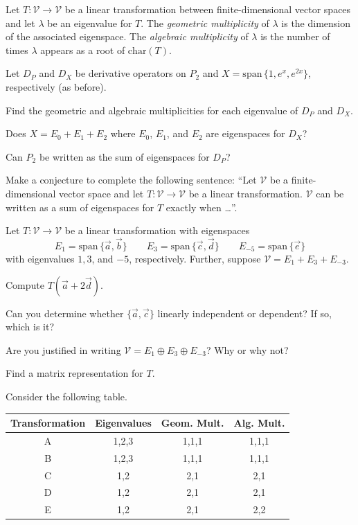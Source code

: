 \documentclass[14pt]{problemset}
\newcommand{\Span}{\mathrm{span}\,}
\newcommand{\Char}{\mathrm{char}}
\begin{document}
	\begin{definition}
		Let $T:\mathcal V\to\mathcal V$ be a linear transformation 
		between finite-dimensional vector spaces and let $\lambda$
		be an eigenvalue for $T$. The \emph{geometric multiplicity} of $\lambda$ is
		the dimension of the associated eigenspace. The \emph{algebraic multiplicity} of
		$\lambda$ is the number of times $\lambda$ appears as a root of $\Char(T)$.
	\end{definition}

	\question
	Let $D_P$ and $D_X$ be derivative operators on $P_2$ and $X=\Span\{1,e^x,e^{2x}\}$, respectively (as before).
	\begin{parts}
		\item Find the geometric and algebraic multiplicities for each eigenvalue of $D_P$ and $D_X$.
		\item Does $X=E_0+E_1+E_2$ where $E_0$, $E_1$, and $E_2$ are eigenspaces for $D_X$?
		\item Can $P_2$ be written as the sum of eigenspaces for $D_P$?
		\item Make a conjecture to complete the following sentence: 
			``Let $\mathcal V$ be a finite-dimensional vector space and let $T:\mathcal V\to\mathcal V$
			be a linear transformation. $\mathcal V$
			can be written as a sum of eigenspaces for $T$ exactly when \ldots''.
	\end{parts}

	\newpage
	\question
	Let $T:\mathcal V\to\mathcal V$ be a linear transformation with eigenspaces
	\[
		E_1=\Span\{\vec a,\vec b\}\qquad E_3=\Span\{\vec c,\vec d\}\qquad E_{-5}=\Span\{\vec e\}
	\]
	with eigenvalues $1,3$, and $-5$, respectively. Further, suppose $\mathcal V=E_1+E_3+E_{-3}$.
	\begin{parts}
		\item Compute $T(\vec a+2\vec d)$.
		\item Can you determine whether $\{\vec a,\vec c\}$ linearly independent or dependent?
			If so, which is it?
		\item Are you justified in writing $\mathcal V=E_1\oplus E_3\oplus E_{-3}$? Why or why not?
		\item Find a matrix representation for $T$.
	\end{parts}

	\question
	Consider the following table.

	\begin{tabular}{c|c|c|c}
		Transformation & Eigenvalues & Geom. Mult. & Alg. Mult. \\
		\hline
		A & 1,2,3 & 1,1,1 & 1,1,1\\
		B & 1,2,3 & 1,1,1 & 1,1,1 \\
		C & 1,2 & 2,1& 2,1\\
		D & 1,2 & 2,1& 2,1\\
		E & 1,2 & 2,1& 2,2\\
	\end{tabular}
\end{document}
